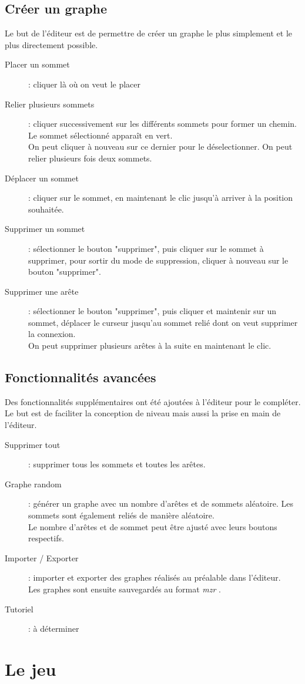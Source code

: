 \documentclass[12pt]{article}
\begin{document}
\subsection{Créer un graphe}
Le but de l'éditeur est de permettre de créer un graphe le plus simplement et le plus directement possible.

\begin{description}
    \item[Placer un sommet]:
    cliquer là où on veut le placer

    \item[Relier plusieurs sommets]:
    cliquer successivement sur les différents sommets pour former un chemin. Le sommet sélectionné apparaît en vert.\\
    On peut cliquer à nouveau sur ce dernier pour le déselectionner. On peut relier plusieurs fois deux sommets.

    \item[Déplacer un sommet]:
    cliquer sur le sommet, en maintenant le clic jusqu'à arriver à la position souhaitée.

    \item[Supprimer un sommet]:
    sélectionner le bouton "supprimer", puis cliquer sur le sommet à supprimer, pour sortir du mode de suppression, cliquer à nouveau sur le bouton "supprimer".

    \item[Supprimer une arête]:
    sélectionner le bouton "supprimer", puis cliquer et maintenir sur un sommet, déplacer le curseur jusqu'au sommet relié dont on veut supprimer la connexion.\\
    On peut supprimer plusieurs arêtes à la suite en maintenant le clic.

\end{description}


\subsection{Fonctionnalités avancées}
Des fonctionnalités supplémentaires ont été ajoutées à l'éditeur pour le compléter.\\
Le but est de faciliter la conception de niveau mais aussi la prise en main de l'éditeur.
\begin{description}
    \item[Supprimer tout]: supprimer tous les sommets et toutes les arêtes.
    
    \item[Graphe random]: générer un graphe avec un nombre d'arêtes et de sommets aléatoire. Les sommets sont également reliés de manière aléatoire.\\
    Le nombre d'arêtes et de sommet peut être ajusté avec leurs boutons respectifs.

    \item[Importer / Exporter]: importer et exporter des graphes réalisés au préalable dans l'éditeur.\\
    Les graphes sont ensuite sauvegardés au format \textit{mzr} .

    \item[Tutoriel]: à déterminer

\end{description}

\section{Le jeu}
\end{document}
